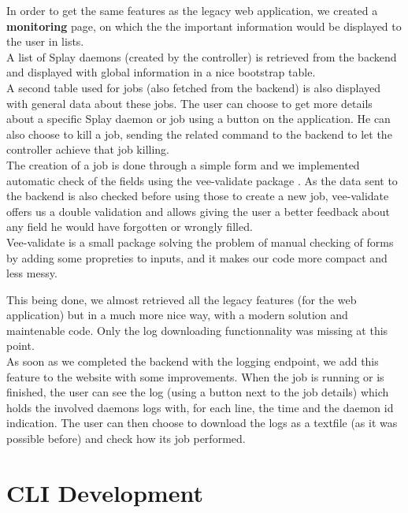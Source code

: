\documentclass{eplmastersthesis}
\begin{document}
        In order to get the same features as the legacy web application,
        we created a \textbf{monitoring} page, on which the the important
        information would be displayed to the user in lists.\\
        A list of Splay daemons (created by the controller) is retrieved
        from the backend and displayed with global information in a nice
        bootstrap table.\\
        A second table used for jobs (also fetched from the backend) is also
        displayed with general data about these jobs. The user can choose to
        get more details about a specific Splay daemon or job using a button
        on the application. He can also choose to kill a job, sending the
        related command to the backend to let the controller achieve that job
        killing.\\
        The creation of a job is done through a simple form and we implemented
        automatic check of the fields using the vee-validate package
        \cite{VeeValidate}. As the data sent to the backend is also checked
        before using those to create a new job, vee-validate offers us
        a double validation and allows giving the user a better feedback
        about any field he would have forgotten or wrongly filled.\\
        Vee-validate is a small package solving the problem of
        manual checking of forms by adding some propreties to inputs, and it
        makes our code more compact and less messy.

        This being done, we almost retrieved all the legacy features (for the
        web application) but in a much more nice way, with a modern solution
        and maintenable code. Only the log downloading functionnality was
        missing at this point. \\
        As soon as we completed the backend with the logging endpoint, we
        add this feature to the website with some improvements. When the
        job is running or is finished, the user can see the log (using a
        button next to the job details) which holds the involved daemons logs
        with, for each line, the time and the daemon id indication. The user
        can then choose to download the logs as a textfile (as it was possible
        before) and check how its job performed.

    \section{CLI Development}
\end{document}
